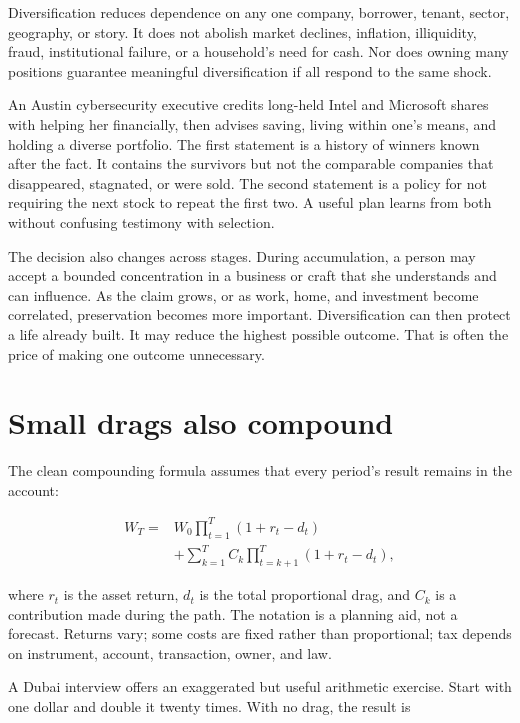 Diversification reduces dependence on any one company, borrower, tenant,
sector, geography, or story. It does not abolish market declines, inflation,
illiquidity, fraud, institutional failure, or a household's need for cash. Nor
does owning many positions guarantee meaningful diversification if all respond
to the same shock.

An Austin cybersecurity executive credits long-held Intel and Microsoft shares
with helping her financially, then advises saving, living within one's means,
and holding a diverse portfolio. The first statement is a history of winners
known after the fact. It contains the survivors but not the comparable
companies that disappeared, stagnated, or were sold. The second statement is a
policy for not requiring the next stock to repeat the first two. A useful plan
learns from both without confusing testimony with selection.

The decision also changes across stages. During accumulation, a person may
accept a bounded concentration in a business or craft that she understands and
can influence. As the claim grows, or as work, home, and investment become
correlated, preservation becomes more important. Diversification can then
protect a life already built. It may reduce the highest possible outcome. That
is often the price of making one outcome unnecessary.

\section{Small drags also compound}

The clean compounding formula assumes that every period's result remains in
the account:

\begin{equation}
\begin{aligned}
W_T={}&W_0\prod_{t=1}^{T}(1+r_t-d_t)\\
&+\sum_{k=1}^{T}C_k\prod_{t=k+1}^{T}(1+r_t-d_t),
\end{aligned}
\end{equation}

where \(r_t\) is the asset return, \(d_t\) is the total proportional drag, and
\(C_k\) is a contribution made during the path. The notation is a planning aid,
not a forecast. Returns vary; some costs are fixed rather than proportional;
tax depends on instrument, account, transaction, owner, and law.

A Dubai interview offers an exaggerated but useful arithmetic exercise. Start
with one dollar and double it twenty times. With no drag, the result is

